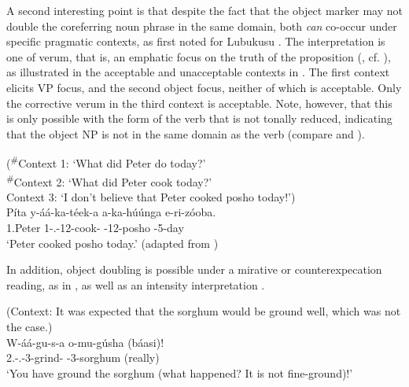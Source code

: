 \documentclass[output=paper]{langscibook}
\begin{document}
\z

A second interesting point is that despite the fact that the object marker may not double the coreferring noun phrase in the same domain, both \textit{can} co-occur under specific pragmatic contexts, as \citet{SikukuDiercks2021} first noted for Lubukusu \citep[see also][]{LippardEtAlFut}. The interpretation is one of verum, that is, an emphatic focus on the truth of the proposition (\citealt{Höhle1992}, cf. \citealt{RomeroHan2004}), as illustrated in the acceptable and unacceptable contexts in . The first context elicits VP focus, and the second object focus, neither of which is acceptable. Only the corrective verum in the third context is acceptable. Note, however, that this is only possible with the form of the verb that is not tonally reduced, indicating that the object NP is not in the same domain as the verb (compare  and ).

\ea
\label{bkm:Ref116461196}
(\textsuperscript{\#}Context 1: ‘What did Peter do today?’\\
\textsuperscript{\#}Context 2: ‘What did Peter cook today?’\\
Context 3: ‘I don’t believe that Peter cooked posho today!’)\\
\gll
Píta  y-áá-ka-téek-a  a-ka-húúnga  e-ri-zóoba.\\
1.Peter  1\SM{}-\N{}.\PST{}-12\OM{}-cook-\FV{}  \AUG{}-12-posho  \AUG{}-5-day \\
\glt
‘Peter cooked posho today.’ (adapted from \citealt[52]{vanderWalAsiimwe2020})

\z


In addition, object doubling is possible under a mirative or counterexpecation reading, as in , as well as an intensity interpretation .

\ea
\label{bkm:Ref116461205}
(Context: It was expected that the sorghum would be ground well, which was not the case.)\\
\gll
W-áá-gu-s-a  o-mu-gúsha  (báasi)!\\
2\SG{}.\SM{}-\N{}.\PST{}-3\OM{}-{}grind-\FV{}  \AUG{}-{}3-sorghum  (really)\\
\glt
‘You have ground the sorghum (what happened? It is not fine-ground)!’\\
\end{document}
